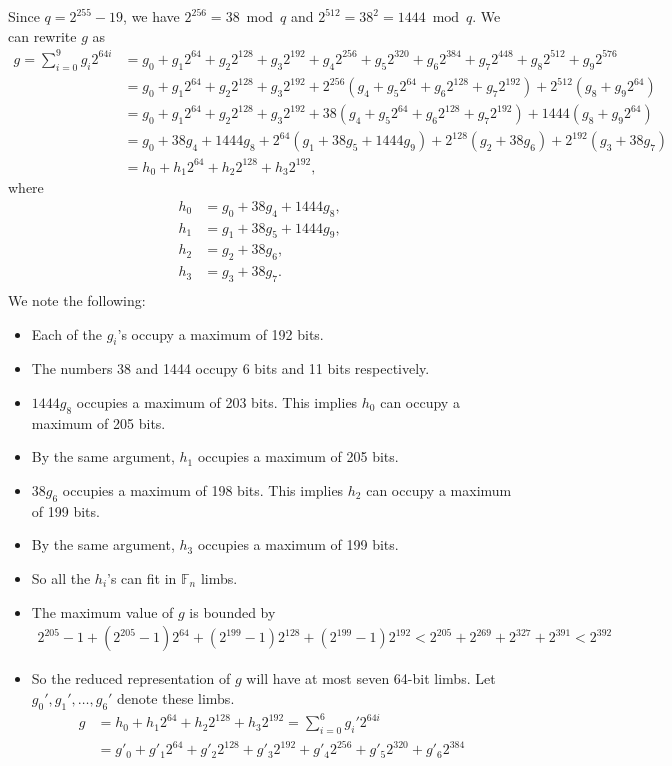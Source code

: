 \documentclass[a4paper, 12pt]{article}
\begin{document}
Since $q = 2^{255}-19$, we have $2^{256} = 38 \bmod q$ and $2^{512} = 38^2 = 1444 \bmod q$. We can rewrite $g$ as
\begin{align*}
  g  = \sum^{9}_{i=0} g_i 2^{64i} &= g_0 + g_1 2^{64} + g_2 2^{128} + g_3 2^{192} + g_4 2^{256} +   g_5 2^{320} + g_6 2^{384} + g_7 2^{448} + g_8 2^{512} + g_9 2^{576}\\
   &= g_0 + g_1 2^{64} + g_2 2^{128} + g_3 2^{192} + 2^{256} \left(  g_4 +   g_5 2^{64} + g_6 2^{128} + g_7 2^{192} \right) + 2^{512}\left(g_8  + g_9 2^{64} \right)\\
   &= g_0 + g_1 2^{64} + g_2 2^{128} + g_3 2^{192} + 38 \left(  g_4 +   g_5 2^{64} + g_6 2^{128} + g_7 2^{192} \right) + 1444 \left(g_8  + g_9 2^{64} \right)\\
   &= g_0 + 38 g_4 + 1444 g_8 + 2^{64} \left( g_1 + 38g_5 +1444g_9 \right)+ 2^{128} \left(  g_2 + 38 g_6\right) + 2^{192} \left( g_3 +38 g_7\right)\\
   & = h_0 + h_1 2^{64} + h_2 2^{128} + h_3 2^{192},
\end{align*}
where
\begin{align*}
  h_0 & = g_0 + 38 g_4 + 1444 g_8,\\
  h_1 & = g_1 + 38 g_5 + 1444 g_9,\\
  h_2 & = g_2 + 38 g_6,\\
  h_3 & = g_3 + 38 g_7.\\
\end{align*}
We note the following:
\begin{itemize}
  \item Each of the $g_i$'s occupy a maximum of 192 bits.
  \item The numbers 38 and 1444 occupy 6 bits and 11 bits respectively.
  \item $1444g_8$ occupies a maximum of 203 bits. This implies $h_0$ can occupy a maximum of 205 bits.
  \item By the same argument, $h_1$ occupies a maximum of 205 bits.
  \item $38g_6$ occupies a maximum of 198 bits. This implies $h_2$ can occupy a maximum of 199 bits.
  \item By the same argument, $h_3$ occupies a maximum of 199 bits.
  \item So all the $h_i$'s can fit in $\mathbb{F}_n$ limbs.
  \item The maximum value of $g$ is bounded by
    \begin{align*}
      2^{205} - 1 + \left(2^{205} - 1\right) 2^{64}+ \left( 2^{199}-1 \right)2^{128}+ \left( 2^{199}-1 \right)2^{192} < 2^{205} + 2^{269} + 2^{327} + 2^{391} < 2^{392}
    \end{align*}
  \item So the reduced representation of $g$ will have at most seven 64-bit limbs. Let $g_0', g_1',\ldots,g_6'$ denote these limbs.
   \begin{align*}
   g & = h_0 + h_1 2^{64} + h_2 2^{128} + h_3 2^{192} = \sum^{6}_{i=0} g_i' 2^{64i}\\
     & = g'_0 + g'_1 2^{64} + g'_2 2^{128} + g'_3 2^{192} + g'_4 2^{256} +   g'_5 2^{320} + g'_6 2^{384}
   \end{align*}
\end{itemize}
\end{document}
